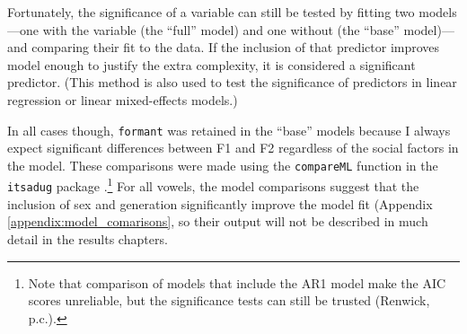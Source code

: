 Fortunately, the significance of a variable can still be tested by fitting two models---one with the variable (the ``full'' model) and one without (the ``base'' model)---and comparing their fit to the data. If the inclusion of that predictor improves model enough to justify the extra complexity, it is considered a significant predictor. (This method is also used to test the significance of predictors in linear regression or linear mixed-effects models.)

In all cases though, \texttt{formant} was retained in the ``base'' models because I always expect significant differences between F1 and F2 regardless of the social factors in the model. These comparisons were made using the \texttt{compareML} function in the \texttt{itsadug} package \citep{van_rij_etal_2017_itsadug}.\footnote{Note that comparison of models that include the AR1 model make the AIC scores unreliable, but the significance tests can still be trusted (Renwick, p.c.). } For all vowels, the model comparisons suggest that the inclusion of sex and generation significantly improve the model fit (Appendix \ref{appendix:model_comarisons}, so their output will not be described in much detail in the results chapters.



